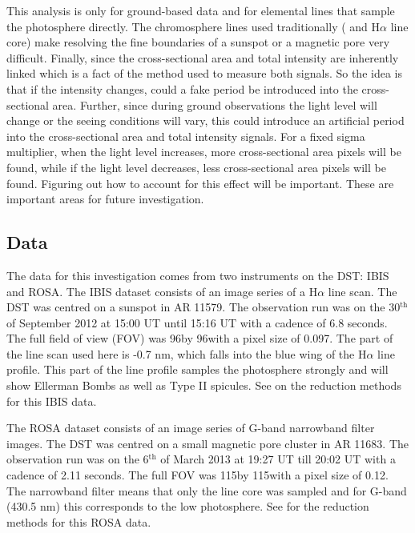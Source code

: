 	This analysis is only for ground-based data and for elemental lines that sample the photosphere directly.
	The chromosphere lines used traditionally ( and H$\alpha$ line core) make resolving the fine boundaries of a sunspot or a magnetic pore very difficult.
	Finally, since the cross-sectional area and total intensity are inherently linked which is a fact of the method used to measure both signals.
	So the idea is that if the intensity changes, could a fake period be introduced into the cross-sectional area.
    Further, since during ground observations the light level will change or the seeing conditions will vary, this could introduce an artificial period into the cross-sectional area and total intensity signals.
    For a fixed sigma multiplier, when the light level increases, more cross-sectional area pixels will be found, while if the light level decreases, less cross-sectional area pixels will be found. 
    Figuring out how to account for this effect will be important. 
    These are important areas for future investigation.
    
    \subsection{Data}
    
    The data for this investigation comes from two instruments on the DST: IBIS and ROSA.
    The IBIS dataset consists of an image series of a H$\alpha$ line scan.
    The DST was centred on a sunspot in AR 11579.
    The observation run was on the 30$^{\mathrm{th}}$ of September 2012 at 15:00 UT until 15:16 UT with a cadence of 6.8 seconds.
    The full field of view (FOV) was 96\arcsecs by 96\arcsecs with a pixel size of 0.097\arcsecs.
    The part of the line scan used here is -0.7 nm, which falls into the blue wing of the H$\alpha$ line profile.
    This part of the line profile samples the photosphere strongly and will show Ellerman Bombs as well as Type II spicules.
    See \cite{2013A&A...560A..31N} on the reduction methods for this IBIS data.

    The ROSA dataset consists of an image series of G-band narrowband filter images.
    The DST was centred on a small magnetic pore cluster in AR 11683.
    The observation run was on the 6$^{\mathrm{th}}$ of March 2013 at 19:27 UT till 20:02 UT with a cadence of 2.11 seconds.
    The full FOV was 115\arcsecs by 115\arcsecs with a pixel size of 0.12\arcsecs.
    The narrowband filter means that only the line core was sampled and for G-band (430.5 nm) this corresponds to the low photosphere.
    See \cite{0004-637X-806-1-132} for the reduction methods for this ROSA data.
    

